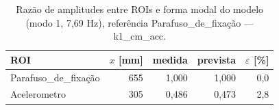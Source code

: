 \begin{table}[htbp]
  \centering
  \caption{Razão de amplitudes entre ROIs e forma modal do modelo (modo 1, 7{,}69 Hz), referência Parafuso\_de\_fixação — k1\_cm\_acc.}
  \label{tab:forma_modal_k1_cm_acc}
  \begin{tabular}{lrrrr}
    \toprule
    ROI & $x$ [mm] & medida & prevista & $\varepsilon$ [\%] \\
    \midrule
    Parafuso\_de\_fixação & 655 & 1{,}000 & 1{,}000 & 0{,}0 \\
    Acelerometro & 305 & 0{,}486 & 0{,}473 & 2{,}8 \\
    \bottomrule
  \end{tabular}
\end{table}
